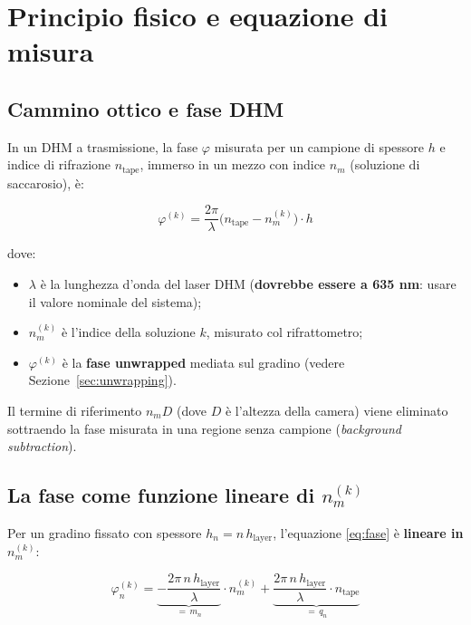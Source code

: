 \section{Principio fisico e equazione di misura}

\subsection{Cammino ottico e fase DHM}

In un DHM a trasmissione, la fase $\varphi$ misurata per un campione di spessore
$h$ e indice di rifrazione $n_\text{tape}$, immerso in un mezzo con indice
$n_m$ (soluzione di saccarosio), è:

\begin{equation}
  \varphi^{(k)} = \frac{2\pi}{\lambda}
  \bigl(n_\text{tape} - n_m^{(k)}\bigr)\cdot h
  \label{eq:fase}
\end{equation}

dove:
\begin{itemize}
  \item $\lambda$ è la lunghezza d'onda del laser DHM
        (\textbf{dovrebbe essere a 635 nm}: usare il valore nominale del sistema);
  \item $n_m^{(k)}$ è l'indice della soluzione $k$, misurato col rifrattometro;
  \item $\varphi^{(k)}$ è la \textbf{fase unwrapped} mediata sul gradino
        (vedere Sezione~\ref{sec:unwrapping}).
\end{itemize}

Il termine di riferimento $n_m D$ (dove $D$ è l'altezza della camera) viene
eliminato sottraendo la fase misurata in una regione senza campione
(\textit{background subtraction}).

\subsection{La fase come funzione lineare di $n_m^{(k)}$}

Per un gradino fissato con spessore $h_n = n\,h_\text{layer}$, l'equazione
\eqref{eq:fase} è \textbf{lineare in $n_m^{(k)}$}:

\begin{equation}
  \varphi_n^{(k)}
  = \underbrace{-\frac{2\pi\, n\, h_\text{layer}}{\lambda}}_{=\,m_n} \cdot n_m^{(k)}
  + \underbrace{\frac{2\pi\, n\, h_\text{layer}}{\lambda} \cdot n_\text{tape}}_{=\,q_n}
  \label{eq:retta}
\end{equation}

